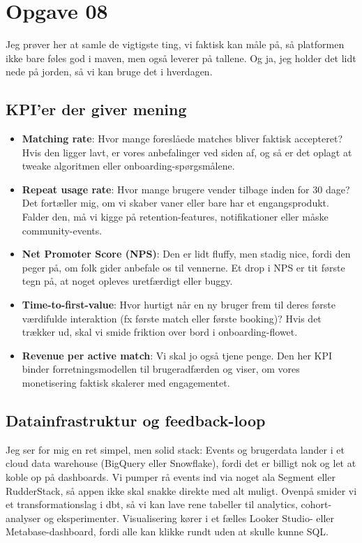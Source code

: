 \section*{Opgave 08}

Jeg prøver her at samle de vigtigste ting, vi faktisk kan måle på, så platformen ikke bare føles god i maven, men også leverer på tallene. Og ja, jeg holder det lidt nede på jorden, så vi kan bruge det i hverdagen.

\subsection*{KPI'er der giver mening}
\begin{itemize}
    \item \textbf{Matching rate}: Hvor mange foreslåede matches bliver faktisk accepteret? Hvis den ligger lavt, er vores anbefalinger ved siden af, og så er det oplagt at tweake algoritmen eller onboarding-spørgsmålene.
    \item \textbf{Repeat usage rate}: Hvor mange brugere vender tilbage inden for 30 dage? Det fortæller mig, om vi skaber vaner eller bare har et engangsprodukt. Falder den, må vi kigge på retention-features, notifikationer eller måske community-events.
    \item \textbf{Net Promoter Score (NPS)}: Den er lidt fluffy, men stadig nice, fordi den peger på, om folk gider anbefale os til vennerne. Et drop i NPS er tit første tegn på, at noget opleves uretfærdigt eller buggy.
    \item \textbf{Time-to-first-value}: Hvor hurtigt når en ny bruger frem til deres første værdifulde interaktion (fx første match eller første booking)? Hvis det trækker ud, skal vi smide friktion over bord i onboarding-flowet.
    \item \textbf{Revenue per active match}: Vi skal jo også tjene penge. Den her KPI binder forretningsmodellen til brugeradfærden og viser, om vores monetisering faktisk skalerer med engagementet.
\end{itemize}

\subsection*{Datainfrastruktur og feedback-loop}
Jeg ser for mig en ret simpel, men solid stack: Events og brugerdata lander i et cloud data warehouse (BigQuery eller Snowflake), fordi det er billigt nok og let at koble op på dashboards. Vi pumper rå events ind via noget ala Segment eller RudderStack, så appen ikke skal snakke direkte med alt muligt. Ovenpå smider vi et transformationslag i dbt, så vi kan lave rene tabeller til analytics, cohort-analyser og eksperimenter. Visualisering kører i et fælles Looker Studio- eller Metabase-dashboard, fordi alle kan klikke rundt uden at skulle kunne SQL.

